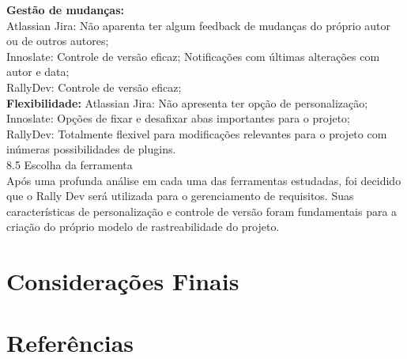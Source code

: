 {{\textbf{Gestão de mudanças:}\\
	\tab Atlassian Jira: Não aparenta ter algum feedback de mudanças do próprio autor ou de outros autores;\\
	\tab Innoslate: Controle de versão eficaz; Notificações com últimas alterações com autor e data;\\
	\tab RallyDev: Controle de versão eficaz;\\

\textbf{Flexibilidade:}
	\tab Atlassian Jira: Não apresenta ter opção de personalização;\\
	\tab Innoslate: Opções de fixar e desafixar abas importantes para o projeto;\\
	\tab RallyDev: Totalmente flexivel para modificações relevantes para o projeto com inúmeras possibilidades de plugins.\\

{\large{8.5 Escolha da ferramenta}}\\

\tab Após uma profunda análise em cada uma das ferramentas estudadas, foi decidido que o Rally Dev será utilizada para o gerenciamento de requisitos. Suas características de personalização e controle de versão foram fundamentais para a criação do próprio modelo de rastreabilidade do projeto.  \\


\section{Considerações Finais}
\label{sec:nova_sess_o}

\section{Referências}
\label{sec:nova_sess_o}




\onecolumn
\begin{usecase}



\end{usecase}
\onecolumn

}}

